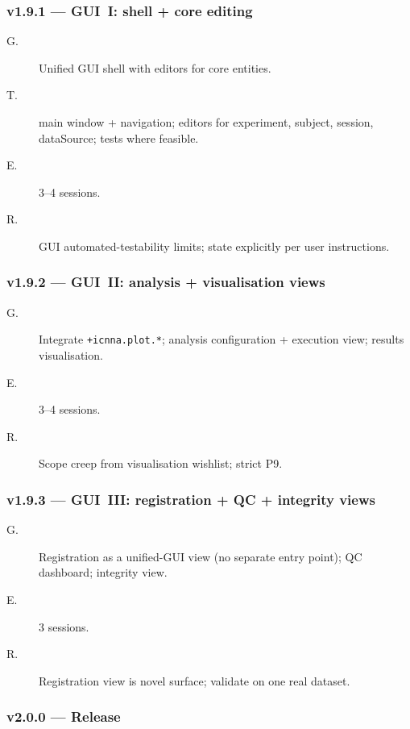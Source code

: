 \documentclass[11pt,a4paper]{article}
\begin{document}
\subsubsection*{v1.9.1 --- GUI~I: shell + core editing}

\begin{description}
    \item[G.] Unified GUI shell with editors for core entities.
    \item[T.] main window + navigation; editors for experiment, subject, session, dataSource; tests where feasible.
    \item[E.] 3--4 sessions.
    \item[R.] GUI automated-testability limits; state explicitly per user instructions.
\end{description}

\subsubsection*{v1.9.2 --- GUI~II: analysis + visualisation views}

\begin{description}
    \item[G.] Integrate \texttt{+icnna.plot.*}; analysis configuration + execution view; results visualisation.
    \item[E.] 3--4 sessions.
    \item[R.] Scope creep from visualisation wishlist; strict P9.
\end{description}

\subsubsection*{v1.9.3 --- GUI~III: registration + QC + integrity views}

\begin{description}
    \item[G.] Registration as a unified-GUI view (no separate entry point); QC dashboard; integrity view.
    \item[E.] 3 sessions.
    \item[R.] Registration view is novel surface; validate on one real dataset.
\end{description}

\subsubsection*{v2.0.0 --- Release}
\end{document}
